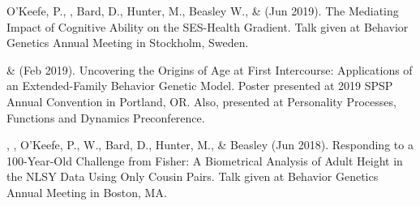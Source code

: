 \item O'Keefe, P., \meb, Bard, D., Hunter, M.,  Beasley W.,  \&  \Joe (Jun 2019). The Mediating Impact of Cognitive Ability on the SES-Health Gradient. Talk given at Behavior Genetics Annual Meeting in Stockholm, Sweden. 
%
\item \meb \& \Joe (Feb 2019). Uncovering the Origins of Age at First Intercourse: Applications of an Extended-Family Behavior Genetic Model. Poster presented at 2019 SPSP Annual Convention in Portland, OR. Also, presented at Personality Processes, Functions and Dynamics Preconference.
%
\item\Joe, \meb, O'Keefe, P., W., Bard, D., Hunter, M., \& Beasley (Jun 2018). Responding to a 100-Year-Old Challenge from Fisher: A Biometrical Analysis of Adult Height in the NLSY Data Using Only Cousin Pairs. Talk given at Behavior Genetics Annual Meeting in Boston, MA. 

